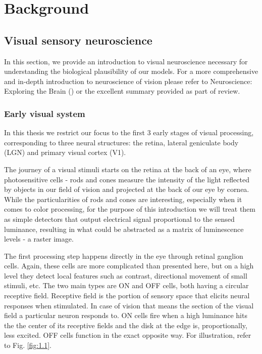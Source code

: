 \chapter{Background}

\section{Visual sensory neuroscience}
In this section, we provide an introduction to visual neuroscience necessary for understanding the biological plausibility of our models. For a more comprehensive and in-depth introduction to neuroscience of vision please refer to Neuroscience: Exploring the Brain (\cite{bear_neuroscience:_2007}) or the excellent summary provided as part of \cite{Carandini10577} review.

\subsection{Early visual system}
In this thesis we restrict our focus to the first 3 early stages of visual processing, corresponding to three neural structures: the retina, lateral geniculate body (LGN) and primary visual cortex (V1).

The journey of a visual stimuli starts on the retina at the back of an eye, where photosensitive cells - rods and cones measure the intensity of the light reflected by objects in our field of vision and projected at the back of our eye by cornea. While the particularities of rods and cones are interesting, especially when it comes to color processing, for the purpose of this introduction we will treat them as simple detectors that output electrical signal proportional to the sensed luminance, resulting in what could be abstracted as a matrix of luminescence levels - a raster image. 

The first processing step happens directly in the eye through retinal ganglion cells. Again, these cells are more complicated than presented here, but on a high level they detect local features such as contrast, directional movement of small stimuli, etc. The two main types are ON and OFF cells, both having a circular receptive field. Receptive field is the portion of sensory space that elicits neural responses when stimulated. In case of vision that means the section of the visual field a particular neuron responds to. ON cells fire when a high luminance hits the the center of its receptive fields and the disk at the edge is, proportionally, less excited. OFF cells function in the exact opposite way. For illustration, refer to Fig. \ref{fig:1.1}.

